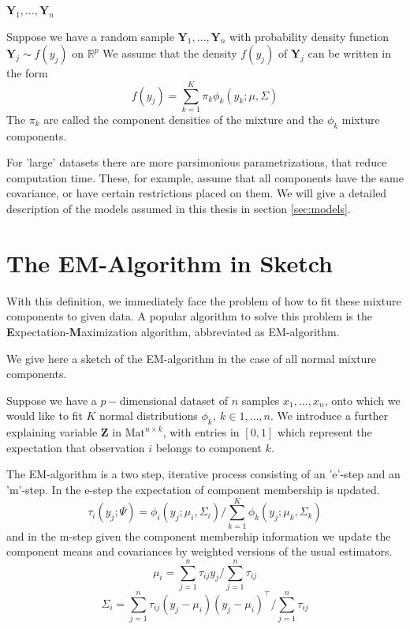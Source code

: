 $ \pmb{Y}_1, \dots , \pmb{Y}_n $

\begin{definition}
    Suppose we have a random sample $ \pmb{Y}_1, \dots , \pmb{Y}_n $ with 
    probability density function $ \pmb{Y}_j \sim f(y_j) $ on 
    $\mathbb{R}^p$ We assume that the density $ f(y_j) $ of $ \pmb{Y}_j $ can 
    be written in the form 
    \[ f(y_j) = \sum_{k=1}^{K} \pi_k \phi_k (y_k; \mu, \Sigma) \]
    The $ \pi_k $ are called the component densities of the mixture and the 
    $\phi_k$ mixture components.
\end{definition}

For 'large' datasets there are more parsimonious parametrizations, that reduce
computation time. These, for example, assume that all components have the same
covariance, or have certain restrictions placed on them. We will give a 
detailed description of the models assumed in this thesis in section 
\ref{sec:models}.


\section{The EM-Algorithm in Sketch}

With this definition, we immediately face the problem of how to fit these
mixture components to given data. A popular algorithm to solve this problem 
is the {\bf E}xpectation-{\bf M}aximization algorithm, abbreviated as 
EM-algorithm.

We give here a sketch of the EM-algorithm in the case of all normal mixture 
components.

Suppose we have a $p-$dimensional dataset of $n$ samples $x_1, \dots ,x_n$,
onto which we would like to fit $K$ normal distributions 
$\phi_k,\ k \in {1,\dots , n}$. 
We introduce a further explaining variable $\pmb{Z}$ in 
$\textrm{Mat}^{n\times k}$, with entries in $[0,1]$ which represent the 
expectation that observation $i$ belongs to component $k$.

The EM-algorithm is a two step, iterative process consisting of an 'e'-step
and an 'm'-step.
In the e-step the expectation of component membership is updated.
\[ \tau_i(y_j;\Psi) = \phi_i(y_j;\mu_i, \Sigma_i)/ \sum_{k=1}^K \phi_k(y_j;
    \mu_k, \Sigma_k)\]
and in the m-step given the component membership information we update the 
component means and covariances by weighted versions of the usual estimators.
\[\mu_i = \sum_{j=1}^n \tau_{ij}y_j / \sum_{j=1}^n \tau_{ij}\]
\[\Sigma_i = \sum_{j=1}^n \tau_{ij} (y_j- \mu_i)(y_j-\mu_i)^\top / 
    \sum_{j=1}^n \tau_{ij}\]


